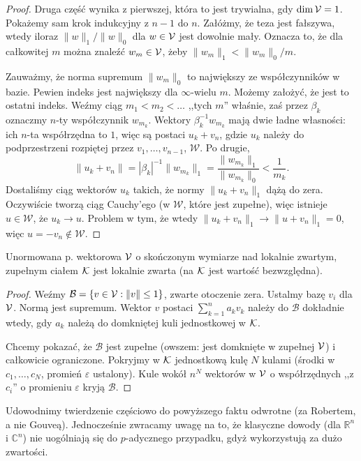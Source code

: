 \begin{proof}
	Druga część wynika z pierwszej, która to jest trywialna, gdy $\dim \mathcal V =1$.
	Pokażemy sam krok indukcyjny z $n-1$ do $n$.
	Załóżmy, że teza jest fałszywa, wtedy iloraz $\|w\|_1 / \|w\|_0$ dla $w \in \mathcal V$ jest dowolnie mały.
	Oznacza to, że dla całkowitej $m$ można znaleźć $w_m \in \mathcal V$, żeby $\|w_m\|_1 < \|w_m\|_0/m$.

	Zauważmy, że norma supremum $\|w_m\|_0$ to największy ze współczynników w bazie.
	Pewien indeks jest największy dla $\infty$-wielu $m$.
	Możemy założyć, że jest to ostatni indeks.
	Weźmy ciąg $m_1 <  m_2 < \dots$ ,,tych $m$'' właśnie, zaś przez $\beta_k$ oznaczmy $n$-ty współczynnik $w_{m_k}$.
	Wektory $\beta_k^{-1} w_{m_k}$ mają dwie ładne własności: ich $n$-ta współrzędna to $1$, więc są postaci $u_k + v_n$, gdzie $u_k$ należy do podprzestrzeni rozpiętej przez $v_1, \dots, v_{n-1}$, $\mathcal W$.
	Po drugie,
	\[
		\|u_k + v_n\| = |\beta_k|^{-1} \|w_{m_k}\|_1 = \frac{\|w_{m_k}\|_1}{\|w_{m_k}\|_0} < \frac 1 {m_k}.
	\]
	Dostaliśmy ciąg wektorów $u_k$ takich, że normy $\|u_k + v_n\|_1$ dążą do zera.
	Oczywiście tworzą ciąg Cauchy'ego (w $\mathcal W$, które jest zupełne), więc istnieje $u \in \mathcal W$, że $u_k \to u$.
	Problem w tym, że wtedy $\|u_k + v_n\|_1 \to \|u + v_n\|_1 = 0$, więc $u = -v_n \not \in \mathcal W$.
\end{proof}

\begin{fakt}
	Unormowana p. wektorowa $\mathcal V$ o skończonym wymiarze nad lokalnie zwartym, zupełnym ciałem $\mathcal K$ jest lokalnie zwarta (na $\mathcal K$ jest wartość bezwzględna).
\end{fakt}

\begin{proof}
	Weźmy $\mathcal B = \{v \in \mathcal V : \|v\| \le 1\}$, zwarte otoczenie zera.
	Ustalmy bazę $v_i$ dla $\mathcal V$.
	Normą jest supremum.
	Wektor $v$ postaci $\sum_{k=1}^n a_k v_k$ należy do $\mathcal B$ dokładnie wtedy, gdy $a_k$ należą do domkniętej kuli jednostkowej w $\mathcal K$.

	Chcemy pokazać, że $\mathcal B$ jest zupełne (owszem: jest domknięte w zupełnej $\mathcal V$) i całkowicie ograniczone.
	Pokryjmy w $\mathcal K$ jednostkową kulę $N$ kulami (środki w $c_1, \dots, c_N$, promień $\varepsilon$ ustalony).
	Kule wokół $n^N$ wektorów w $\mathcal V$ o współrzędnych ,,z $c_i$'' o promieniu $\varepsilon$ kryją $\mathcal B$. 
\end{proof}

Udowodnimy twierdzenie częściowo do powyższego faktu odwrotne (za Robertem, a nie Gouveą).
Jednocześnie zwracamy uwagę na to, że klasyczne dowody (dla $\mathbb R^n$ i $\mathbb C^n$) nie uogólniają się do $p$-adycznego przypadku, gdyż wykorzystują za dużo zwartości.

